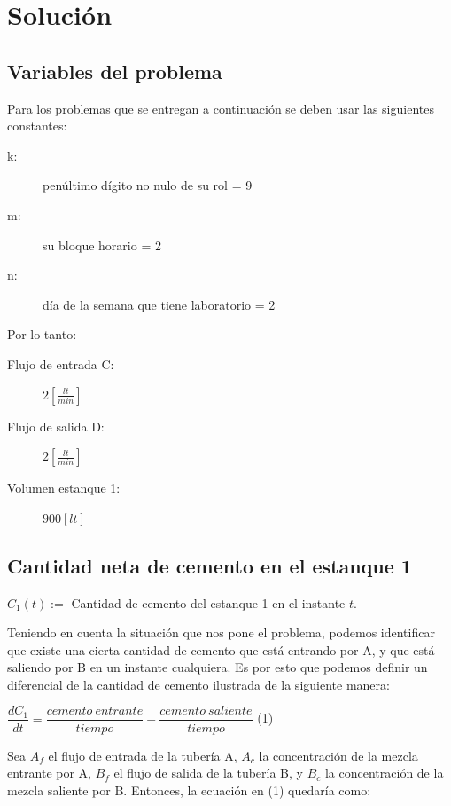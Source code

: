 \documentclass[12pt,letterpaper]{article}
\begin{document}
\section{Solución}
\subsection{Variables del problema}

Para los problemas que se entregan a continuación se deben usar las siguientes constantes:
\begin{description}
\item[k:] penúltimo dígito no nulo de su rol = 9
\item[m:] su bloque horario = 2
\item[n:] día de la semana que tiene laboratorio = 2
\end{description}

Por lo tanto:
\begin{description}
\item[Flujo de entrada C:] $2 [\frac{lt}{min}]$
\item[Flujo de salida D:] $2 [\frac{lt}{min}]$
\item[Volumen estanque 1:] $900 [lt]$
\end{description}

\newpage

\subsection{Cantidad neta de cemento en el estanque 1}

\begin{center}
$C_1(t) := $ Cantidad de cemento del estanque 1 en el instante $t$.
\end{center}

Teniendo en cuenta la situación que nos pone el problema, podemos identificar que existe una cierta cantidad de cemento que está entrando por A, y que está saliendo por B en un instante cualquiera. Es por esto que podemos definir un diferencial de la cantidad de cemento ilustrada de la siguiente manera:

\begin{center}
$\dfrac{dC_1}{dt} = \dfrac{cemento\ entrante}{tiempo} - \dfrac{cemento\ saliente}{tiempo}$ (1)
\end{center}

Sea $A_f$ el flujo de entrada de la tubería A, $A_c$ la concentración de la mezcla entrante por A, $B_f$ el flujo de salida de la tubería B, y $B_c$ la concentración de la mezcla saliente por B. Entonces, la ecuación en (1) quedaría como:
\end{document}
